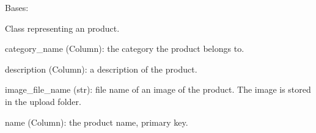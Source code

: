 \documentclass[letterpaper,10pt,english]{sphinxmanual}
\begin{document}

\begin{fulllineitems}
\label{database_setup:database_setup.Product}
Bases: 

Class representing an product.

\begin{fulllineitems}
\label{database_setup:database_setup.Product.category}
\end{fulllineitems}


\begin{fulllineitems}
\label{database_setup:database_setup.Product.category_name}
category\_name (Column): the category the product belongs to.

\end{fulllineitems}


\begin{fulllineitems}
\label{database_setup:database_setup.Product.description}
description (Column): a description of the product.

\end{fulllineitems}


\begin{fulllineitems}
\label{database_setup:database_setup.Product.image_file_name}
image\_file\_name (str): file name of an image of the product.
The image is stored in the upload folder.

\end{fulllineitems}


\begin{fulllineitems}
\label{database_setup:database_setup.Product.name}
name (Column): the product name, primary key.

\end{fulllineitems}


\end{fulllineitems}
\end{document}
